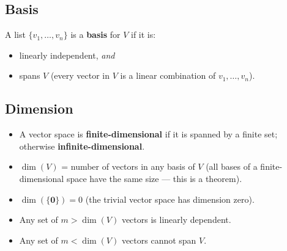 \documentclass[hidelinks]{article}
\begin{document}
\subsection{Basis}
A list $\{v_1, \ldots, v_n\}$ is a \textbf{basis} for $V$ if it is:
\begin{itemize}
    \item linearly independent, \emph{and}
    \item spans $V$ (every vector in $V$ is a linear combination of $v_1,\ldots,v_n$).
\end{itemize}

\subsection{Dimension}
\begin{itemize}
    \item A vector space is \textbf{finite-dimensional} if it is spanned by a finite set; otherwise \textbf{infinite-dimensional}.
    \item $\dim(V)$ = number of vectors in any basis of $V$ (all bases of a finite-dimensional space have the same size — this is a theorem).
    \item $\dim(\{\mathbf{0}\}) = 0$ \quad (the trivial vector space has dimension zero).
    \item Any set of $m > \dim(V)$ vectors is linearly dependent.
    \item Any set of $m < \dim(V)$ vectors cannot span $V$.
\end{itemize}
\end{document}
